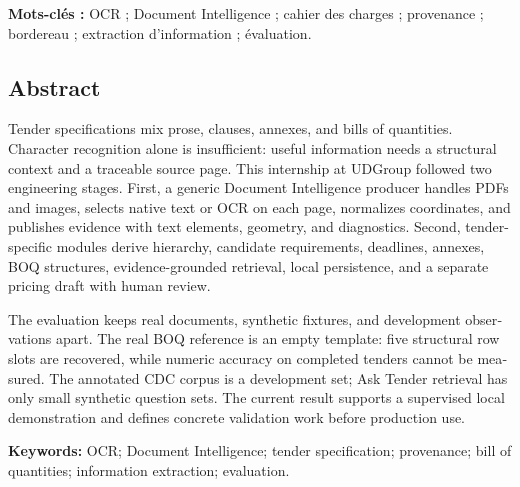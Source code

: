 \textbf{Mots-clés :} OCR ; Document Intelligence ; cahier des charges ; provenance ; bordereau ; extraction d'information ; évaluation.
\clearpage
\begin{otherlanguage}{english}
\chapter*{Abstract}
Tender specifications mix prose, clauses, annexes, and bills of quantities. Character recognition alone is insufficient: useful information needs a structural context and a traceable source page. This internship at UDGroup followed two engineering stages. First, a generic Document Intelligence producer handles PDFs and images, selects native text or OCR on each page, normalizes coordinates, and publishes evidence with text elements, geometry, and diagnostics. Second, tender-specific modules derive hierarchy, candidate requirements, deadlines, annexes, BOQ structures, evidence-grounded retrieval, local persistence, and a separate pricing draft with human review.

The evaluation keeps real documents, synthetic fixtures, and development observations apart. The real BOQ reference is an empty template: five structural row slots are recovered, while numeric accuracy on completed tenders cannot be measured. The annotated CDC corpus is a development set; Ask Tender retrieval has only small synthetic question sets. The current result supports a supervised local demonstration and defines concrete validation work before production use.

\textbf{Keywords:} OCR; Document Intelligence; tender specification; provenance; bill of quantities; information extraction; evaluation.
\end{otherlanguage}
\clearpage
